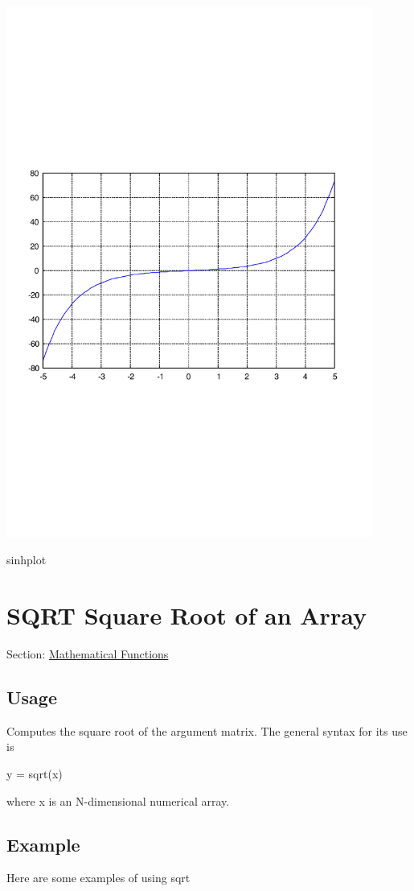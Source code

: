  
\begin{DoxyImage}
\includegraphics[width=12cm]{sinhplot}
\caption{sinhplot}
\end{DoxyImage}
 \hypertarget{mathfunctions_sqrt}{}\section{S\-Q\-R\-T Square Root of an Array}\label{mathfunctions_sqrt}
Section\-: \hyperlink{sec_mathfunctions}{Mathematical Functions} \hypertarget{vtkwidgets_vtkxyplotwidget_Usage}{}\subsection{Usage}\label{vtkwidgets_vtkxyplotwidget_Usage}
Computes the square root of the argument matrix. The general syntax for its use is \begin{DoxyVerb}   y = sqrt(x)
\end{DoxyVerb}
 where {\ttfamily x} is an N-\/dimensional numerical array. \hypertarget{variables_struct_Example}{}\subsection{Example}\label{variables_struct_Example}
Here are some examples of using {\ttfamily sqrt}


